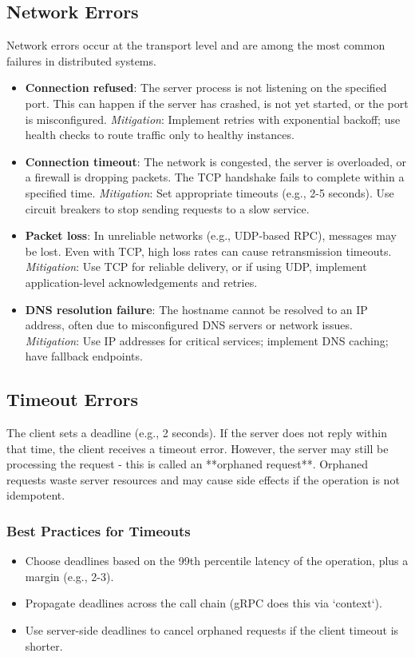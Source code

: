 \documentclass[a4paper]{article}
\begin{document}
\subsection{Network Errors}
Network errors occur at the transport level and are among the most common failures in distributed systems.

\begin{itemize}
    \item \textbf{Connection refused}: The server process is not listening on the specified port. This can happen if the server has crashed, is not yet started, or the port is misconfigured.  
        \textit{Mitigation}: Implement retries with exponential backoff; use health checks to route traffic only to healthy instances.

    \item \textbf{Connection timeout}: The network is congested, the server is overloaded, or a firewall is dropping packets. The TCP handshake fails to complete within a specified time.  
        \textit{Mitigation}: Set appropriate timeouts (e.g., 2-5 seconds). Use circuit breakers to stop sending requests to a slow service.

    \item \textbf{Packet loss}: In unreliable networks (e.g., UDP-based RPC), messages may be lost. Even with TCP, high loss rates can cause retransmission timeouts.  
        \textit{Mitigation}: Use TCP for reliable delivery, or if using UDP, implement application-level acknowledgements and retries.

    \item \textbf{DNS resolution failure}: The hostname cannot be resolved to an IP address, often due to misconfigured DNS servers or network issues.  
        \textit{Mitigation}: Use IP addresses for critical services; implement DNS caching; have fallback endpoints.
\end{itemize}

\subsection{Timeout Errors}
The client sets a deadline (e.g., 2 seconds). If the server does not reply within that time, the client receives a timeout error. However, the server may still be processing the request - this is called an **orphaned request**. Orphaned requests waste server resources and may cause side effects if the operation is not idempotent.

\subsubsection{Best Practices for Timeouts}
\begin{itemize}
    \item Choose deadlines based on the 99th percentile latency of the operation, plus a margin (e.g., 2-3).
    \item Propagate deadlines across the call chain (gRPC does this via `context`).
    \item Use server-side deadlines to cancel orphaned requests if the client timeout is shorter.
\end{itemize}
\end{document}

